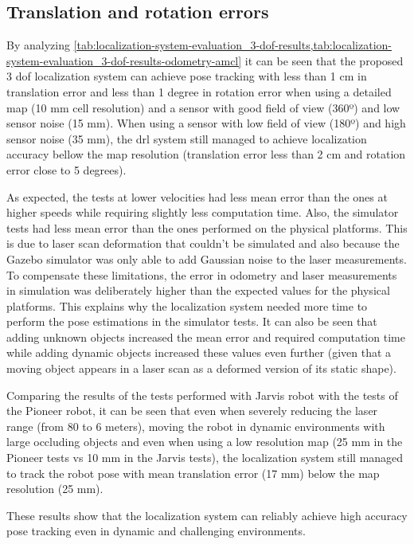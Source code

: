 \subsection{Translation and rotation errors}

By analyzing \cref{tab:localization-system-evaluation_3-dof-results,tab:localization-system-evaluation_3-dof-results-odometry-amcl} it can be seen that the proposed 3 \gls{dof} localization system can achieve pose tracking with less than 1 cm in translation error and less than 1 degree in rotation error when using a detailed map (10 mm cell resolution) and a sensor with good field of view (360º) and low sensor noise (15 mm). When using a sensor with low field of view (180º) and high sensor noise (35 mm), the \gls{drl} system still managed to achieve localization accuracy bellow the map resolution (translation error less than 2 cm and rotation error close to 5 degrees).

As expected, the tests at lower velocities had less mean error than the ones at higher speeds while requiring slightly less computation time. Also, the simulator tests had less mean error than the ones performed on the physical platforms. This is due to laser scan deformation that couldn't be simulated and also because the Gazebo simulator was only able to add Gaussian noise to the laser measurements. To compensate these limitations, the error in odometry and laser measurements in simulation was deliberately higher than the expected values for the physical platforms. This explains why the localization system needed more time to perform the pose estimations in the simulator tests. It can also be seen that adding unknown objects increased the mean error and required computation time while adding dynamic objects increased these values even further (given that a moving object appears in a laser scan as a deformed version of its static shape).

Comparing the results of the tests performed with Jarvis robot  with the tests of the Pioneer robot, it can be seen that even when severely reducing the laser range (from 80 to 6 meters), moving the robot in dynamic environments with large occluding objects and even when using a low resolution map (25 mm in the Pioneer tests vs 10 mm in the Jarvis tests), the localization system still managed to track the robot pose with mean translation error (17 mm) below the map resolution (25 mm).

These results show that the localization system can reliably achieve high accuracy pose tracking even in dynamic and challenging environments.

